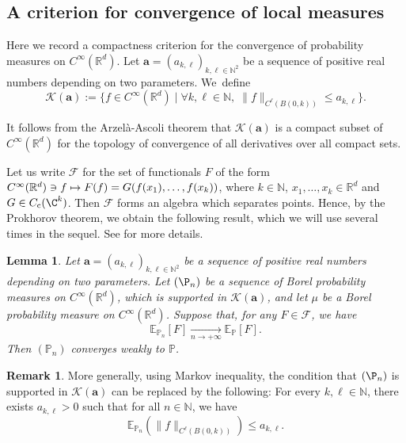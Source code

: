 \documentclass[10pt]{amsart}
\let\mathcal\mathscr
\newcommand\mto{\mathchoice{\longmapsto}{\mapsto}{\mapsto}{\mapsto}}
\let\sep\mid
\newcommand{\rc}{\mathrm{c}}
\theoremstyle{plain}
\newtheorem{lemma}[theorem]{Lemma}
\theoremstyle{definition}
\newtheorem{remark}[theorem]{Remark}
\newcommand{\N}{\mathbb{N}}
\newcommand{\R}{\mathbb{R}}
\begin{document}
\subsection{A criterion for convergence of local measures}\label{ss:criterion}
Here we record a compactness criterion for the convergence of probability measures on $C^\infty(\R^d)$. Let $\boldsymbol{a} = (a_{k,\ell})_{k,\ell \in \N^2}$ be a sequence of positive real numbers depending on two parameters. We~define
\begin{equation}\label{eq:CompSet}
\mathcal{K}(\boldsymbol{a}):= \{f\in C^\infty(\R^d) \sep\forall k, \ell \in \N,\; \|f\|_{C^\ell (B(0,k))} \leq a_{k,\ell}\}.
\end{equation}

It follows from the Arzelà-Ascoli theorem that $\mathcal{K}(\boldsymbol{a})$ is a compact subset of $C^\infty(\R^d)$ for the topology of convergence of all derivatives over all compact sets.

Let us write $\mathcal{F}$ for the set of functionals $F$ of the form
$C^\infty(\R^d)\ni f\mto F(f) = G(f(x_1),\dots, f(x_k))$,
where $k\in \N$, $x_1,\dots, x_k\in \R^d$ and $G\in C_\rc(\C^k)$.
Then $\mathcal{F}$ forms an algebra which separates points. Hence, by the Prokhorov theorem, we obtain the following result, which we will use several times in the sequel. See \cite[\S3]{LWL} for more details.

\begin{lemma}\label{lem:CritMes}
Let $\boldsymbol{a} = (a_{k,\ell})_{k,\ell \in \N^2}$ be a sequence of positive real numbers depending on two parameters. Let $(\P_n)$ be a sequence of Borel probability measures on $C^\infty(\R^d)$, which is supported in $\mathcal{K}(\boldsymbol{a})$, and let $\mu$ be a Borel probability measure on $C^\infty(\R^d)$. Suppose that, for any $F\in \mathcal{F}$, we have
\[
\mathbb{E}_{\mathbb{P}_n}[F] \underset{n\to +\infty}{\to} \mathbb{E}_{\mathbb{P}}[F].
\]
Then $(\mathbb{P}_n)$ converges weakly to $\mathbb{P}$.
\end{lemma}

\begin{remark}\label{rem:CondEsperance}
More generally, using Markov inequality, the condition that $(\P_n)$ is supported in $\mathcal{K}(\boldsymbol{a})$ can be replaced by the following:
For every $k, \ell\in \N$, there exists $a_{k,\ell}>0$ such that for all $n\in \N$, we have
\[
\mathbb{E}_{\mathbb{P}_n} \left(\| f\|_{C^\ell (B(0,k))} \right)\leq a_{k,\ell}.
\]
\end{remark}
\end{document}
